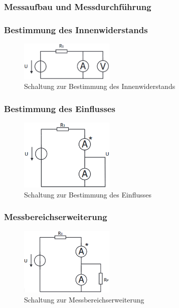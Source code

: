 \documentclass[a4paper]{article}
\begin{document}
\subsubsection{Messaufbau und Messdurchführung}
\subsubsection*{Bestimmung des Innenwiderstands}

\begin{figure}[h]
    \centering
    \includegraphics[width=0.4\textwidth]{schematics/2a_RiAM.png}
    \caption{Schaltung zur Bestimmung des Innenwiderstands}
    \label{fig:2a_RiAM}
\end{figure}

\subsubsection*{Bestimmung des Einflusses}

\begin{figure}[h]
    \centering
    \includegraphics[width=0.4\textwidth]{schematics/2b_EinflussAM.png}
    \caption{Schaltung zur Bestimmung des Einflusses}
    \label{fig:2b_EinflussAM}
\end{figure}

\subsubsection*{Messbereichserweiterung}

\begin{figure}[h]
    \centering
    \includegraphics[width=0.4\textwidth]{schematics/2c_MessbereichserweiterungAM.png}
    \caption{Schaltung zur Messbereichserweiterung}
    \label{fig:2c_MB-ErweiterungAM}
\end{figure}
\end{document}
